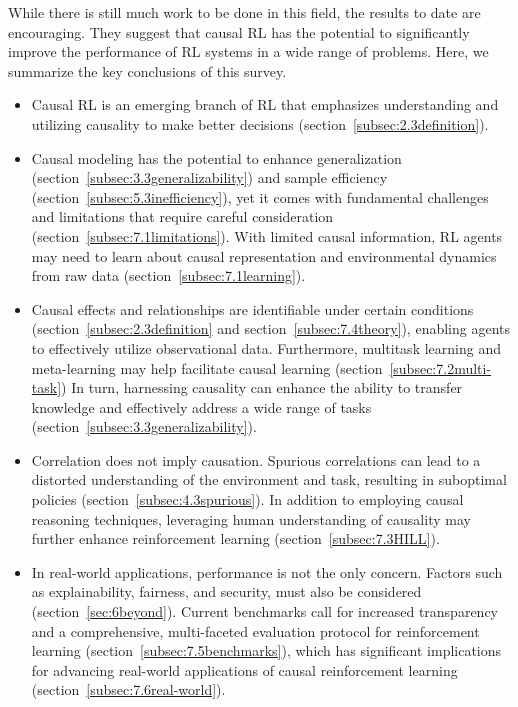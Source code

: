 \documentclass[10pt]{article} %
\theoremstyle{definition}
\begin{document}
While there is still much work to be done in this field, the results to date are encouraging. 
They suggest that causal RL has the potential to significantly improve the performance of RL systems in a wide range of problems. 
Here, we summarize the key conclusions of this survey.

\begin{itemize}
\item Causal RL is an emerging branch of RL that emphasizes understanding and utilizing causality to make better decisions (section~\ref{subsec:2.3definition}). 
\item Causal modeling has the potential to enhance generalization (section~\ref{subsec:3.3generalizability}) and sample efficiency (section~\ref{subsec:5.3inefficiency}), yet it comes with fundamental challenges and limitations that require careful consideration (section~\ref{subsec:7.1limitations}). With limited causal information, RL agents may need to learn about causal representation and environmental dynamics from raw data (section~\ref{subsec:7.1learning}).
\item Causal effects and relationships are identifiable under certain conditions (section~\ref{subsec:2.3definition} and section~\ref{subsec:7.4theory}), enabling agents to effectively utilize observational data. Furthermore, multitask learning and meta-learning may help facilitate causal learning (section~\ref{subsec:7.2multi-task}) In turn, harnessing causality can enhance the ability to transfer knowledge and effectively address a wide range of tasks (section~\ref{subsec:3.3generalizability}).
\item Correlation does not imply causation. Spurious correlations can lead to a distorted understanding of the environment and task, resulting in suboptimal policies (section~\ref{subsec:4.3spurious}). In addition to employing causal reasoning techniques, leveraging human understanding of causality may further enhance reinforcement learning (section~\ref{subsec:7.3HILL}).
\item In real-world applications, performance is not the only concern. Factors such as explainability, fairness, and security, must also be considered (section~\ref{sec:6beyond}). Current benchmarks call for increased transparency and a comprehensive, multi-faceted evaluation protocol for reinforcement learning (section~\ref{subsec:7.5benchmarks}), which has significant implications for advancing real-world applications of causal reinforcement learning (section~\ref{subsec:7.6real-world}).
\end{itemize}
\end{document}
